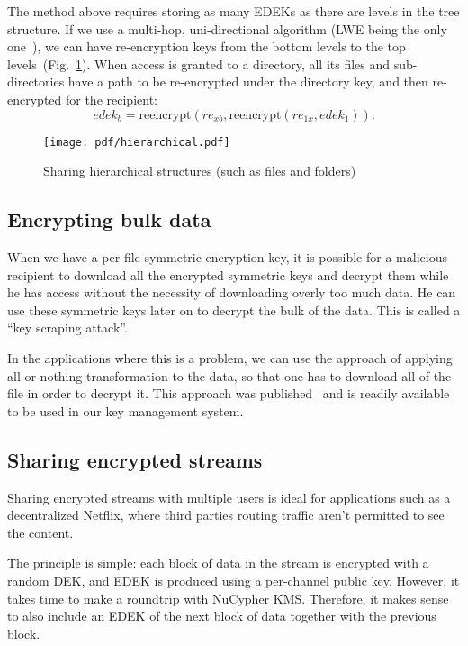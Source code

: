 \documentclass[longbibliography,nofootinbib]{revtex4-1}
\newcommand{\kms}{NuCypher KMS}
\newcommand{\figref}[1]{Fig.~\ref{#1}}
\begin{document}
The method above requires storing as many EDEKs as there are levels in the tree structure.
If we use a multi-hop, uni-directional algorithm (LWE being the only one~\cite{lwe-reencryption}), we can have re-encryption keys from the bottom levels to
the top levels~(\figref{fig:hierarchical-pre}).
When access is granted to a directory, all its files and sub-directories have a path to be re-encrypted under the directory key, and then re-encrypted for the
recipient:
\begin{equation}
    edek_b = \text{reencrypt}(re_{xb}, \text{reencrypt}(re_{1x}, edek_1)).
\end{equation}
\begin{figure}
\centering
    \texttt{[image: pdf/hierarchical.pdf]}
    \caption{Sharing hierarchical structures (such as files and folders)}
    \label{fig:hierarchical-pre}
\end{figure}

\subsection{Encrypting bulk data}

When we have a per-file symmetric encryption key, it is possible for a malicious recipient to download all the encrypted symmetric keys and decrypt them
while he has access without the necessity of downloading overly too much data.
He can use these symmetric keys later on to decrypt the bulk of the data.
This is called a ``key scraping attack''.

In the applications where this is a problem, we can use the approach of applying all-or-nothing transformation to the data, so that one has to download all of the
file in order to decrypt it.
This approach was published~\cite{aont-bulk} and is readily available to be used in our key management system.

\subsection{Sharing encrypted streams}

Sharing encrypted streams with multiple users is ideal for applications such as a decentralized Netflix, where third parties routing traffic
aren't permitted to see the content.

The principle is simple: each block of data in the stream is encrypted with a random DEK, and EDEK is produced using a per-channel public key.
However, it takes time to make a roundtrip with \kms.
Therefore, it makes sense to also include an EDEK of the next block of data together with the previous block.
\end{document}
